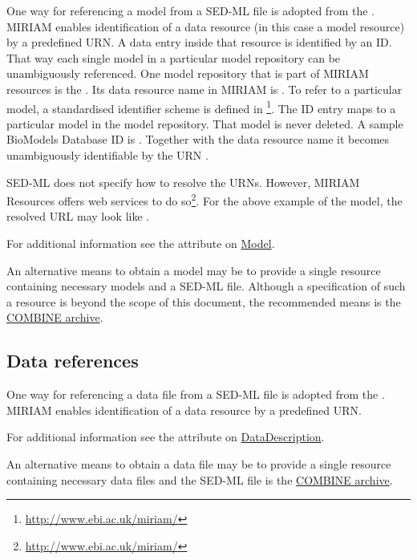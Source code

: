 One way for referencing a model from a SED-ML file is adopted from the . MIRIAM enables identification of a data resource (in this case a model resource) by a predefined URN. A data entry inside that resource is identified by an ID. That way each single  model in a particular model repository can be unambiguously referenced. One model repository that is part of MIRIAM resources is the  \citep{LDR+10}. Its data resource name in MIRIAM is . To refer to a particular model, a standardised identifier scheme is defined in \footnote{\url{http://www.ebi.ac.uk/miriam/}}. The ID entry maps to a particular model in the model repository. That model is never deleted. A sample BioModels Database ID is . Together with the data resource name it becomes unambiguously identifiable by the URN . 

SED-ML does not specify how to resolve the URNs. However, MIRIAM Resources offers web services to do so\footnote{\url{http://www.ebi.ac.uk/miriam/}}. For the above example of the  model, the resolved URL may look like .

For additional information see the \hyperref[sec:model_source]{} attribute on \hyperref[class:model]{Model}.

An alternative means to obtain a model may be to provide a single resource containing necessary models and a SED-ML file. Although a specification of such a resource is beyond the scope of this document, the recommended means is the \hyperref[sec:archive]{COMBINE archive}.


\subsection{Data references}
\label{sec:dataURI}
One way for referencing a data file from a SED-ML file is adopted from the . MIRIAM enables identification of a data resource by a predefined URN. 

For additional information see the \hyperref[sec:data_source]{} attribute on \hyperref[class:dataDescription]{DataDescription}.

An alternative means to obtain a data file may be to provide a single resource containing necessary data files and the SED-ML file is the \hyperref[sec:archive]{COMBINE archive}. 


